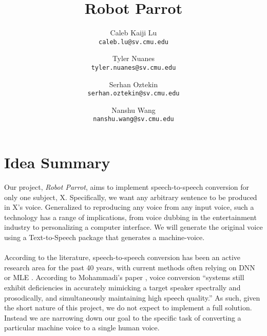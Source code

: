 \documentclass[11pt]{article}
\title{Robot Parrot}
\author{
	Caleb Kaiji Lu \\
	{\tt caleb.lu@sv.cmu.edu}
	\and
	Tyler Nuanes \\
	{\tt tyler.nuanes@sv.cmu.edu}
	\and
	Serhan Oztekin \\
	{\tt serhan.oztekin@sv.cmu.edu}
	\and
	Nanshu Wang \\
	{\tt nanshu.wang@sv.cmu.edu}
}
\date{}
\begin{document}
\maketitle

\section{Idea Summary}
Our project, \textit{Robot Parrot}, aims to implement speech-to-speech conversion for only one subject, X. Specifically, we want any arbitrary sentence to be produced in X's voice. Generalized to reproducing any voice from any input voice, such a technology has a range of implications, from voice dubbing in the entertainment industry to personalizing a computer interface. We will generate the original voice using a Text-to-Speech package that generates a machine-voice.\\
\\
According to the literature, speech-to-speech conversion has been an active research area for the past 40 years, with current methods often relying on DNN \cite{desai2009voice} or MLE \cite{toda2007voice}. According to Mohammadi's paper \cite{mohammadi2017verview}, voice conversion ``systems still exhibit deficiencies in accurately mimicking a target speaker spectrally and prosodically, and simultaneously maintaining high speech quality.'' As such, given the short nature of this project, we do not expect to implement a full solution. Instead we are narrowing down our goal to the specific task of converting a particular machine voice to a single human voice. 
\end{document}
